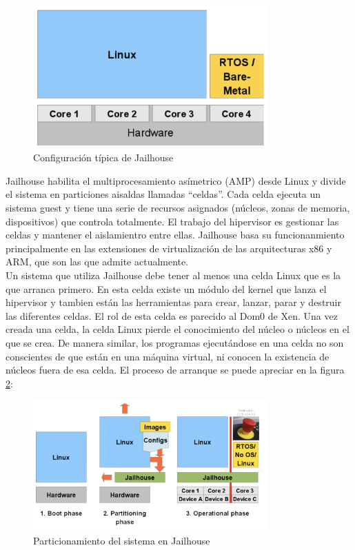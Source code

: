 \begin{figure}[h]
  \centering
  \includegraphics[width=0.80\textwidth]{recursos/jailhouse_1.png}
  \caption{Configuración típica de Jailhouse}
  \label{fig:jail_1}
\end{figure}

Jailhouse habilita el multiprocesamiento asímetrico (AMP) desde Linux y divide el sistema en particiones aisaldas llamadas ``celdas''. Cada celda ejecuta un sistema guest y tiene una serie de recursos asignados (núcleos, zonas de memoria, dispositivos) que controla totalmente. El trabajo del hipervisor es gestionar las celdas y mantener el aislamientro entre ellas. Jailhouse basa su funcionanmiento principalmente en las extensiones de virtualización de las arquitecturas x86 y ARM, que son las que admite actualmente.\\
Un sistema que utiliza Jailhouse debe tener al menos una celda Linux que es la que arranca primero. En esta celda existe un módulo del kernel que lanza el hipervisor y tambien están las herramientas para crear, lanzar, parar y destruir las diferentes celdas. El rol de esta celda es parecido al Dom0 de Xen. Una vez creada una celda, la celda Linux pierde el conocimiento del núcleo o núcleos en el que se crea. De manera similar, los programas ejecutándose en una celda no son conscientes de que están en una máquina virtual, ni conocen la existencia de núcleos fuera de esa celda. El proceso de arranque se puede apreciar en la figura \ref{fig:jail_2}:\\

\begin{figure}[h]
  \centering
  \includegraphics[width=0.80\textwidth]{recursos/jailhouse_2.png}
  \caption{Particionamiento del sistema en Jailhouse}
  \label{fig:jail_2}
\end{figure}
